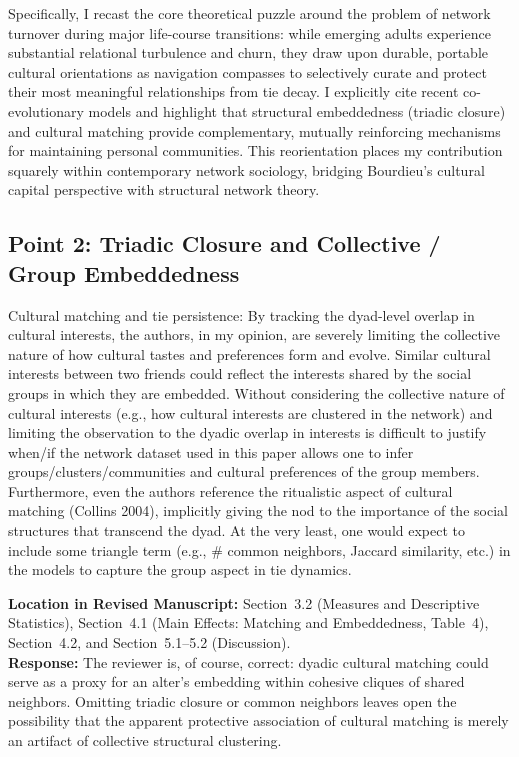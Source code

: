 \documentclass[11pt]{article}
\begin{document}
Specifically, I recast the core theoretical puzzle around the problem of network turnover during major life-course transitions: while emerging adults experience substantial relational turbulence and churn, they draw upon durable, portable cultural orientations as navigation compasses to selectively curate and protect their most meaningful relationships from tie decay. I explicitly cite recent co-evolutionary models and highlight that structural embeddedness (triadic closure) and cultural matching provide complementary, mutually reinforcing mechanisms for maintaining personal communities. This reorientation places my contribution squarely within contemporary network sociology, bridging Bourdieu's cultural capital perspective with structural network theory.

\subsection*{Point 2: Triadic Closure and Collective / Group Embeddedness}

\begin{reviewercomment}
Cultural matching and tie persistence: By tracking the dyad-level overlap in cultural interests, the authors, in my opinion, are severely limiting the collective nature of how cultural tastes and preferences form and evolve. Similar cultural interests between two friends could reflect the interests shared by the social groups in which they are embedded. Without considering the collective nature of cultural interests (e.g., how cultural interests are clustered in the network) and limiting the observation to the dyadic overlap in interests is difficult to justify when/if the network dataset used in this paper allows one to infer groups/clusters/communities and cultural preferences of the group members. Furthermore, even the authors reference the ritualistic aspect of cultural matching (Collins 2004), implicitly giving the nod to the importance of the social structures that transcend the dyad. At the very least, one would expect to include some triangle term (e.g., \# common neighbors, Jaccard similarity, etc.) in the models to capture the group aspect in tie dynamics.
\end{reviewercomment}

\noindent\textbf{Location in Revised Manuscript:} Section~3.2 (Measures and Descriptive Statistics), Section~4.1 (Main Effects: Matching and Embeddedness, Table~4), Section~4.2, and Section~5.1--5.2 (Discussion).\\[4pt]
\textbf{Response:} The reviewer is, of course, correct: dyadic cultural matching could serve as a proxy for an alter's embedding within cohesive cliques of shared neighbors. Omitting triadic closure or common neighbors leaves open the possibility that the apparent protective association of cultural matching is merely an artifact of collective structural clustering.
\end{document}
